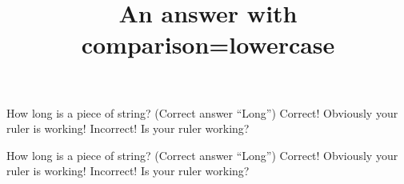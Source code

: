 \documentclass[onepage]{webquiz}
\title{An answer with comparison=lowercase}
\begin{document}
  \begin{question}     %
     How long is a piece of string?
      (Correct answer ``Long'')
     \whenRight Correct! Obviously your ruler is working!
     \whenWrong Incorrect! Is your ruler working?
  \end{question}
  \begin{question}     %
     How long is a piece of string?
      (Correct answer ``Long'')
     \whenRight Correct! Obviously your ruler is working!
     \whenWrong Incorrect! Is your ruler working?
  \end{question}
\end{document}
